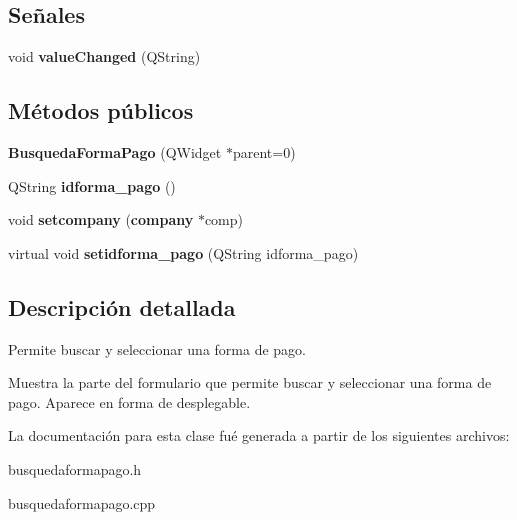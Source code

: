 \subsection*{Se\~{n}ales}
\begin{CompactItemize}
\item 
void {\bf value\-Changed} (QString)\label{classBusquedaFormaPago_l0}

\end{CompactItemize}
\subsection*{M\'{e}todos p\'{u}blicos}
\begin{CompactItemize}
\item 
{\bf Busqueda\-Forma\-Pago} (QWidget $\ast$parent=0)\label{classBusquedaFormaPago_a0}

\item 
QString {\bf idforma\_\-pago} ()\label{classBusquedaFormaPago_a1}

\item 
void {\bf setcompany} ({\bf company} $\ast$comp)\label{classBusquedaFormaPago_a2}

\item 
virtual void {\bf setidforma\_\-pago} (QString idforma\_\-pago)\label{classBusquedaFormaPago_a3}

\end{CompactItemize}


\subsection{Descripci\'{o}n detallada}
Permite buscar y seleccionar una forma de pago. 

Muestra la parte del formulario que permite buscar y seleccionar una forma de pago. Aparece en forma de desplegable. 



La documentaci\'{o}n para esta clase fu\'{e} generada a partir de los siguientes archivos:\begin{CompactItemize}
\item 
busquedaformapago.h\item 
busquedaformapago.cpp\end{CompactItemize}
